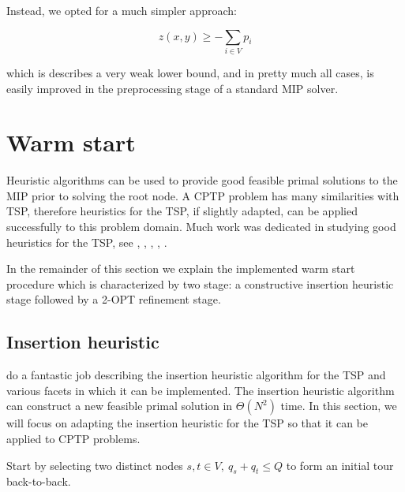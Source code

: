 Instead, we opted for a much simpler approach:

\begin{equation}
	z(x, y) \ge - \sum_{i \in V} p_i
\end{equation}

which is describes a very weak lower bound, and in pretty much all cases, is easily improved in the preprocessing stage of a standard MIP solver.

\section{Warm start}

Heuristic algorithms can be used to provide good feasible primal solutions to the MIP
prior to solving the root node.
A CPTP problem has many similarities with TSP, therefore heuristics for the TSP, if slightly adapted,
can be applied successfully to this problem domain.
Much work was dedicated in studying good heuristics for the TSP, see \cite{rosenkrantz1977}, \cite{johnson1997}, \cite{laporte1992}, \cite{johnson2007}, \cite{hoffman2013}.

In the remainder of this section we explain the implemented warm start procedure which is characterized by two stage: a constructive insertion heuristic stage followed by a 2-OPT refinement stage.

\subsection{Insertion heuristic}
\cite{rosenkrantz1977} do a fantastic job describing the insertion heuristic algorithm for the TSP and various facets in which it can be implemented.
The insertion heuristic algorithm can construct a new feasible primal solution in $\Theta(N^2)$ time.
In this section, we will focus on adapting the insertion heuristic for the TSP so that it can be applied to CPTP problems.

\medskip

Start by selecting two distinct nodes $s, t \in V,\ q_s + q_t \le Q$ to form an initial tour back-to-back.

